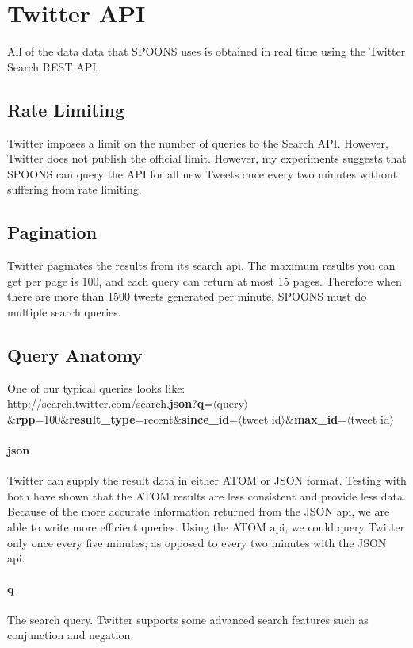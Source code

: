 \documentclass[12pt]{ucthesis}
\begin{document}
\section{Twitter API}
\label{background-twitter-api}
All of the data data that SPOONS uses is obtained in real time using the Twitter Search REST API\cite{TwitterAPI}.

\subsection{Rate Limiting}
\label{api-rate-limit}
Twitter imposes a limit on the number of queries to the Search API. However, Twitter does not publish the official
limit. However, my experiments suggests that SPOONS can query the API for all new Tweets once every two minutes without
suffering from rate limiting.

\subsection{Pagination}
\label{api-pagination}
Twitter paginates the results from its search api. The maximum results you can get per page is 100, and each
query can return at most 15 pages. Therefore when there are more than 1500 tweets generated per minute,
SPOONS must do multiple search queries.

\subsection{Query Anatomy}
\label{api-anatomy}
One of our typical queries looks like:\\
http://search.twitter.com/search.\textbf{json}?\textbf{q}=$\langle$query$\rangle$\&\textbf{rpp}=100\&\textbf{result\_type}=recent\&\textbf{since\_id}=$\langle$tweet id$\rangle$\&\textbf{max\_id}=$\langle$tweet id$\rangle$

\paragraph{json}
Twitter can supply the result data in either ATOM or JSON format. Testing with both have shown that the ATOM
results are less consistent and provide less data. Because of the more accurate information returned from the JSON
api, we are able to write more efficient queries. Using the ATOM api, we could query Twitter only once every five
minutes; as opposed to every two minutes with the JSON api.

\paragraph{q}
The search query. Twitter supports some advanced search features such as conjunction and negation.
\end{document}
